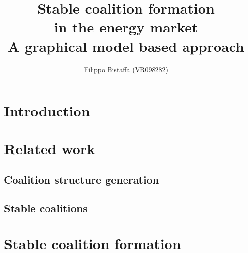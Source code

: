 \documentclass[12pt,a4paper]{report}
\title{\textbf{Stable coalition formation\\in the energy market}\\A graphical model based approach}
\author{Filippo Bistaffa (VR098282)}
\begin{document}
\maketitle

\newpage

\tableofcontents


\chapter{Introduction}
\label{chap:intro}


\chapter{Related work}
\label{chap:relwork}

\section{Coalition structure generation}

\section{Stable coalitions}


\chapter{Stable coalition formation}
\label{chap:scf}
\end{document}

